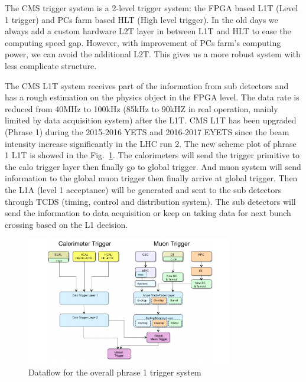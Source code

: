 The CMS trigger system is a 2-level trigger system: the FPGA based L1T (Level 1 trigger) and PCs farm based HLT (High level trigger). In the old days we always add a custom hardware L2T layer in between L1T and HLT to ease the computing speed gap. However, with improvement of PCs farm’s computing power, we can avoid the additional L2T. This gives us a more robust system with less complicate structure. 

The CMS L1T system receives part of the information from sub detectors and has a rough estimation on the physics object in the FPGA level. The data rate is reduced from 40MHz to 100kHz (85kHz to 90kHZ in real operation, mainly limited by data acquisition system) after the L1T. CMS L1T has been upgraded (Phrase 1) during the 2015-2016 YETS and 2016-2017 EYETS since the beam intensity increase significantly in the LHC run 2. The new scheme plot of phrase 1 L1T is showed in the Fig.~\ref{fig:c3cmsl1scheme}. The calorimeters will send the trigger primitive to the calo trigger layer then finally go to global trigger. And muon system will send information to the global muon trigger then finally arrive at global trigger. Then the L1A (level 1 acceptance) will be generated and sent to the sub detectors through TCDS (timing, control and distribution system). The sub detectors will send the information to data acquisition or keep on taking data for next bunch crossing based on the L1 decision. 

\begin{figure}[htbp]
 \begin{center}
  \includegraphics[width=0.8\textwidth]{figures/c3/c3_cms_l1scheme.png}
 \end{center}
 \caption{Dataflow for the overall phrase 1 trigger system}
 \label{fig:c3cmsl1scheme}
\end{figure}

